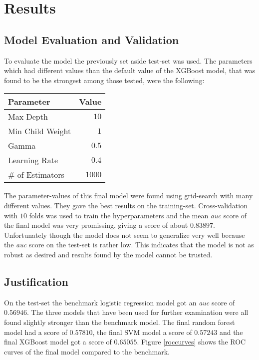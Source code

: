 \documentclass[11pt]{article}
\begin{document}
\section{Results}

\subsection{Model Evaluation and Validation}

To evaluate the model the previously set aside test-set was used. 
The parameters which had different values than the default value
of the XGBoost model, that was found to be the strongest
among those tested, were the following:

\begin{center}
    \begin{tabular}{l|r}
        {\bf Parameter} & {\bf Value} \\ \hline 
        Max Depth & $10$  \\
        Min Child Weight & $1$  \\
        Gamma & $0.5$  \\
        Learning Rate & $0.4$  \\
        \# of Estimators & $1000$  \\
    \end{tabular}
\end{center}
\noindent
The parameter-values of this final model were found using grid-search with many
different values. They gave the best results on the training-set. Cross-validation
with $10$ folds was used to train the hyperparameters and the mean {\it auc}
score of the final model was very promissing, giving a score of about $0.83897$.
Unfortunately though the model does not seem to generalize very well 
because the {\it auc} score on the test-set is rather low. 
This indicates that the model is not as robust as desired and results found
by the model cannot be trusted.

\subsection{Justification}

On the test-set the benchmark logistic regression model got an {\it auc} score of $0.56946$.
The three models that have been used for further examination were all
found slightly stronger than the benchmark model. The final 
random forest model had a score of $0.57810$, the final SVM model a score of
$0.57243$ and the final XGBoost model got a score of $0.65055$. 
Figure \ref{roccurves} shows the ROC curves of the final model compared to the benchmark.
\end{document}
